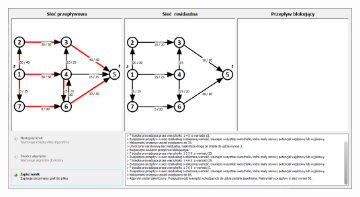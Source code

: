 \begin{appendices}
\begin{figure}
\begin{subfigure}{\textwidth}
 		\end{subfigure}\par\bigskip
 		\begin{subfigure}{\textwidth}
 			\includegraphics[width=0.9\linewidth]{./img/mkm12.jpg}
 		\end{subfigure}
 	\end{figure}
\end{appendices}